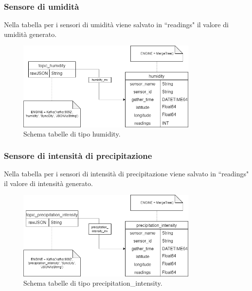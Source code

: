 \documentclass[8pt]{article}
\begin{document}
\subsubsection{Sensore di umidità}
Nella tabella per i sensori di umidità viene salvato in ``readings" il valore di umidità generato.
\begin{figure}[h!]
    \centering
    \includegraphics[width=0.8\textwidth]{images_st/tabelle_humidity.png}
    \caption{Schema tabelle di tipo humidity.}
    \label{fig:Schema tabelle di tipo humidity}
\end{figure}
\subsubsection{Sensore di intensità di precipitazione}
Nella tabella per i sensori di intensità di precipitazione viene salvato in ``readings" il valore di intensità generato.
\begin{figure}[h!]
    \centering
    \includegraphics[width=0.8\textwidth]{images_st/tabelle_precipitation_intensity.png}
    \caption{Schema tabelle di tipo precipitation\_intensity.}
    \label{fig:Schema tabelle di tipo precipitation_intensity}
\end{figure}
\clearpage
\end{document}
